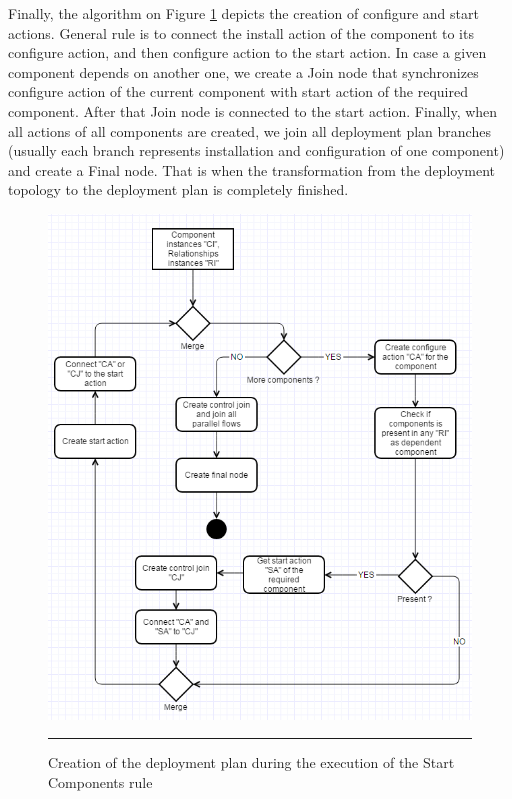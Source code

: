\noindent 

\noindent Finally, the algorithm on Figure \ref{fig:start_rule} depicts the creation of configure and start actions. General rule is to connect the install action of the component to its configure action, and then configure action to the start action. In case a given component depends on another one, we create a Join node that synchronizes configure action of the current component with start action of the required component. After that Join node is connected to the start action. Finally, when all actions of all components are created, we join all deployment plan branches (usually each branch represents installation and configuration of one component) and create a Final node. That is when the transformation from the deployment topology to the deployment plan is completely finished. 

\noindent 

\begin{figure}[htbp]
	\centering
		\includegraphics[width=38em]{./Figures/Start_components}
		\rule{38em}{0.5pt}
	\caption[Starting Rule]{Creation of the deployment plan during the execution of the Start Components rule}
	\label{fig:start_rule}
\end{figure}

